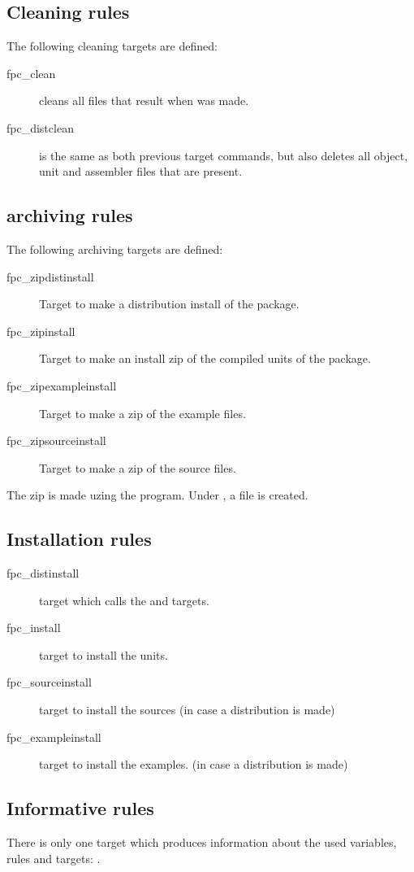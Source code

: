 {\subsection{Cleaning rules}

The following cleaning targets are defined:
\begin{description}
\item[fpc\_clean] cleans all files that result when  was made.
\item[fpc\_distclean] is the same as both previous target commands, but also
deletes all object, unit and assembler files that are present.
\end{description}

\subsection{archiving rules}

The following archiving targets are defined:
\begin{description}
\item[fpc\_zipdistinstall] Target to make a distribution install of the
package.
\item[fpc\_zipinstall] Target to make an install zip of the compiled units
of the  package.
\item[fpc\_zipexampleinstall] Target to make a zip of the example files.
\item[fpc\_zipsourceinstall] Target to make a zip of the source files.
\end{description}
The zip is made uzing the  program. Under \linux, a
 file is created.

\subsection{Installation rules}
\begin{description}
\item[fpc\_distinstall] target which calls the  and
 targets. 
\item[fpc\_install] target to install the units.
\item[fpc\_sourceinstall] target to install the sources (in case a
distribution is made)
\item[fpc\_exampleinstall] target to install the examples. (in case
 a distribution is made)
\end{description}

\subsection{Informative rules}
There is only one target which produces information about the used
variables, rules and targets: .

}
